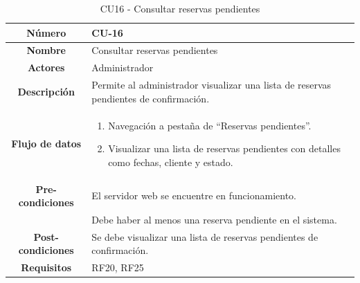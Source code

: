 \begin{table}[h!tb]
	\centering
	\begin{adjustbox}{width=1\textwidth}
	\begin{tabular}{|c|p{\textwidth}|}
		\hline {\bf Número} & CU-16 \\
		\hline {\bf Nombre} & Consultar reservas pendientes\\
		\hline {\bf Actores} & Administrador \\
		\hline {\bf Descripción} & Permite al administrador visualizar una lista de reservas pendientes de confirmación. \\
		\hline {\bf Flujo de datos}
		& 
		\begin{enumerate}
			\item Navegación a pestaña de ``Reservas pendientes''.
			\item Visualizar una lista de reservas pendientes con detalles como fechas, cliente y estado.
		\end{enumerate}\\
		\hline {\bf Pre-condiciones}
		& El servidor web se encuentre en funcionamiento. \\
		& Debe haber al menos una reserva pendiente en el sistema. \\
		\hline {\bf Post-condiciones}
		& Se debe visualizar una lista de reservas pendientes de confirmación. \\
		\hline {\bf Requisitos} & RF20, RF25 \\
		\hline 
	\end{tabular}
	\end{adjustbox}
	\caption{CU16 - Consultar reservas pendientes\label{tbl:CU16}}
\end{table}

